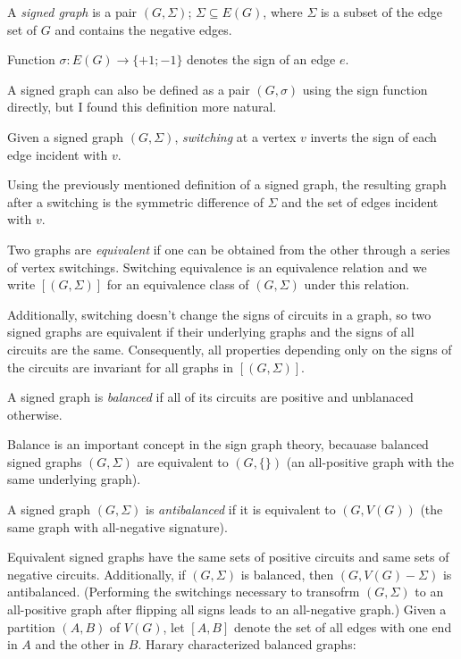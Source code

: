 A \textit{signed graph} is a pair $(G, \Sigma)$; $\Sigma \subseteq E(G)$, where $\Sigma$ is a subset of the edge set of $G$ and contains the negative edges.

Function $\sigma : E(G) \rightarrow \{+1; -1\}$ denotes the sign of an edge $e$.

A signed graph can also be defined as a pair $(G, \sigma)$ using the sign function directly,
but I found this definition more natural.

Given a signed graph $(G, \Sigma)$, \textit{switching} at a vertex $v$ inverts the sign of each edge
incident with $v$.

Using the previously mentioned definition of a signed graph, the resulting graph after a switching
is the symmetric difference of $\Sigma$ and the set of edges incident with $v$.

Two graphs are \textit{equivalent} if one can be obtained from the other through a series of vertex switchings.
Switching equivalence is an equivalence relation and we write $[(G, \Sigma)]$ for an equivalence class of $(G, \Sigma)$ under this relation.

Additionally, switching doesn't change the signs of circuits in a graph, so two signed graphs
are equivalent if their underlying graphs and the signs of all circuits are the same.
Consequently, all properties depending only on the signs of the circuits are invariant for all graphs in $[(G, \Sigma)]$.

A signed graph is \textit{balanced} if all of its circuits are positive and unblanaced otherwise.

Balance is an important concept in the sign graph theory, becauase balanced signed graphs $(G, \Sigma)$ are equivalent to $(G, \{\})$ (an all-positive graph with the same underlying graph).

A signed graph $(G, \Sigma)$ is \textit{antibalanced} if it is equivalent to $(G, V(G))$ (the same graph with all-negative signature).

Equivalent signed graphs have the same sets of positive circuits and same sets of negative circuits.
Additionally, if $(G, \Sigma)$ is balanced, then $(G, V(G) - \Sigma)$ is antibalanced. (Performing the switchings necessary to transofrm $(G, \Sigma)$ to an all-positive graph after flipping all signs leads to an all-negative graph.)
Given a partition $(A, B)$ of $V(G)$, let $[A, B]$ denote the set of all edges with one end in $A$ and the other in $B$.
Harary\cite{harary} characterized balanced graphs:

